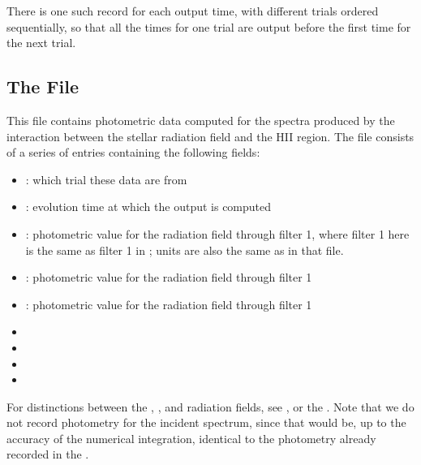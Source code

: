 \documentclass[letterpaper,10pt,english]{sphinxmanual}
\begin{document}
There is one such record for each output time, with different trials ordered sequentially, so that all the times for one trial are output before the first time for the next trial.


\subsection{The  File}
\label{\detokenize{cloudy:the-integrated-cloudyphot-file}}
This file contains photometric data computed for the spectra produced
by the interaction between the stellar radiation field and the HII
region. The file consists of a series of entries containing the
following fields:
\begin{itemize}
\item {} 
: which trial these data are from

\item {} 
: evolution time at which the output is computed

\item {} 
: photometric value for the 
radiation field through filter 1, where filter 1 here is the same as
filter 1 in {\hyperref[\detokenize{output:ssec-int-phot-file}]{}}; units are also the same as
in that file.

\item {} 
: photometric value for the 
radiation field through filter 1

\item {} 
: photometric value for the
 radiation field through filter 1

\item {} 

\item {} 

\item {} 

\item {} 

\end{itemize}

For distinctions between the , , and
 radiation fields, see
{\hyperref[\detokenize{cloudy:sssec-int-cloudyspec-file}]{}}, or the . Note that we do not record photometry for the
incident spectrum, since that would be, up to the accuracy of the
numerical integration, identical to the photometry already recorded in
the {\hyperref[\detokenize{output:ssec-int-phot-file}]{}}.
\end{document}
